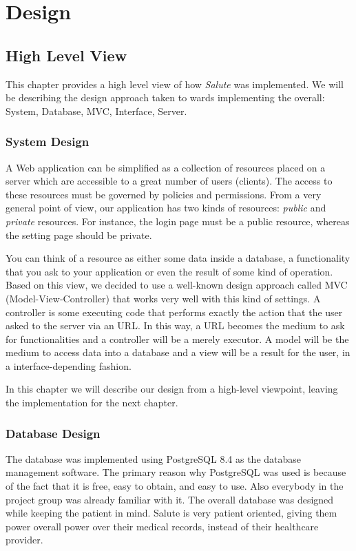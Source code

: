 \documentclass[10pt]{report}
\begin{document}
\part{Design}

\chapter{High Level View}
This chapter provides a high level view of how \emph{Salute} was implemented.  We will be describing the design approach taken to wards implementing the overall: System, Database, MVC, Interface, Server.

\section{System Design}
A Web application can be simplified as a collection of resources placed on a server which are accessible to a great number of users (clients). The access to these resources must be governed by policies and permissions. From a very general point of view, our application has two kinds of resources: \emph{public} and \emph{private} resources. For instance, the login page must be a public resource, whereas the setting page should be private.

You can think of a resource as either some data inside a database, a functionality that you ask to your application or even the result of some kind of operation. Based on this view, we decided to use a well-known design approach called MVC (Model-View-Controller) that works very well with this kind of settings. A controller is some executing code that performs exactly the action that the user asked to the server via an URL. In this way, a URL becomes the medium to ask for functionalities and a controller will be a merely executor. A model will be the medium to access data into a database and a view will be a result for the user, in a interface-depending fashion.

In this chapter we will describe our design from a high-level viewpoint, leaving the implementation for the next chapter.

\section{Database Design}
The database was implemented using PostgreSQL 8.4 as the database management software.  The primary reason why PostgreSQL was used is because of the fact that it is free, easy to obtain, and easy to use. Also everybody in the project group was already familiar with it.
The overall database was designed while keeping the patient in mind.  Salute is very patient oriented, giving them power overall  power over their medical records, instead of their healthcare provider.
\end{document}
